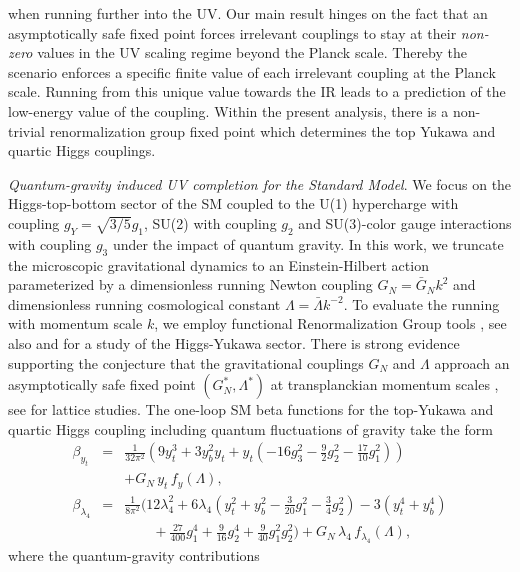 \documentclass[%
 reprint,
 superscriptaddress,
preprintnumbers,
nofootinbib,
 amsmath,amssymb,
 aps,
prl,
]{revtex4-1}
\newcommand{\bea}{\begin{eqnarray}}
\newcommand{\eea}{\end{eqnarray}}
\begin{document}
 when running further
into the UV. 
Our main result hinges on the fact that an asymptotically safe fixed point forces irrelevant couplings to stay at their \emph{non-zero} 
values in the UV scaling regime beyond the Planck scale. Thereby the scenario enforces a specific finite value of each irrelevant coupling at the Planck scale. Running from this unique 
value towards the IR
leads to a prediction of the low-energy value of the coupling. 
Within the present analysis, there is a non-trivial renormalization group fixed point which determines the top Yukawa and quartic Higgs couplings.

\noindent\emph{Quantum-gravity induced UV completion for the Standard Model}.
We focus on the Higgs-top-bottom sector of the SM coupled to the 
U(1) hypercharge with coupling $g_Y=\sqrt{3/5}g_1$, 
SU(2) with coupling $g_2$ and 
SU(3)-color gauge interactions with coupling $g_3$ under the impact of quantum gravity. In this work, we truncate the microscopic gravitational dynamics to an Einstein-Hilbert action parameterized by a dimensionless running Newton coupling $G_N = \bar{G}_N k^2$ and  dimensionless running cosmological constant $\Lambda = \bar{\Lambda}k^{-2}$. To evaluate the running with momentum scale $k$, we employ functional Renormalization Group tools \cite{Wetterich:1992yh}, see also \cite{Morris:1993qb,Berges:2000ew,Reuter:2012id} and \cite{Gies:2014xha} for a study of the Higgs-Yukawa sector. 
 There is strong evidence supporting the conjecture that the gravitational couplings $G_N$ and $\Lambda$ approach an asymptotically safe fixed point $(G_{N}^{\ast}, \Lambda^{\ast})$ at transplanckian momentum scales \cite{Reuter:1996cp,Litim:2003vp}, see \cite{Ambjorn:2012jv} for lattice studies.
The one-loop SM beta functions for the top-Yukawa and quartic Higgs 
coupling
including quantum fluctuations of gravity take the form
\bea
\beta_{y_t} &=&\frac{1}{32 \pi^2}\left(9 y_t^3 +3y_b^2 y_t +y_t\left(-
 16g_3^2 - \frac{9}{2}g_2^2-\frac{17}{10}g_1^2\right)\right)\nonumber \\[0.5ex]
&{}&+ G_N\, y_t\,f_y(\Lambda), \label{eq:betayt} \\[0.5ex]
\beta_{\lambda_4}&=& \frac{1}{8\pi^2} \Bigg(12 \lambda_4^2 +6 \lambda_4 \left(y_t^2 +y_b^2 - \frac{3}{20}g_1^2 -\frac{3}{4}g_2^2 \right) -3 \left(y_t^4
 +y_b^4\right)\nonumber\\[-0.5ex]
 &{}& \quad \quad
+\frac{27}{400}g_1^4 + \frac{9}{16}g_2^4  + \frac{9}{40}g_1^2 g_2^2 
 \Bigg)+ G_N\, \lambda_4\, f_{\lambda_4}(\Lambda),\label{eq:betalambda4}
\eea
where the quantum-gravity contributions 
\end{document}
